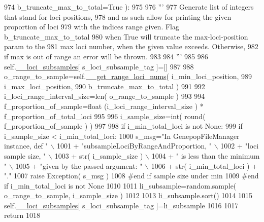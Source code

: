 \begin{DoxyCode}
974             b\_truncate\_max\_to\_total=\textcolor{keyword}{True} ):
975             
976         \textcolor{stringliteral}{'''}
977 \textcolor{stringliteral}{        Generate list of integers that stand for loci positions,}
978 \textcolor{stringliteral}{        and as such allow for printing the given proportion of loci}
979 \textcolor{stringliteral}{        with the indices range given.  Flag b\_truncate\_max\_to\_total}
980 \textcolor{stringliteral}{        when True will truncate the max-loci-position param to the}
981 \textcolor{stringliteral}{        max loci number, when the given value exceeds.  Otherwise,}
982 \textcolor{stringliteral}{        if max is out of range an error will be thrown.}
983 \textcolor{stringliteral}{}
984 \textcolor{stringliteral}{        '''}
985 
986         self.\hyperlink{classnegui_1_1genepopfilemanager_1_1GenepopFileManager_af867ba70728e8a3aaf0097ddd6399e28}{\_\_loci\_subsamples}[ s\_loci\_subsample\_tag ]=[]
987 
988         o\_range\_to\_sample=self.\hyperlink{classnegui_1_1genepopfilemanager_1_1GenepopFileManager_aaa92e1946fdacb522325a288e00eac71}{\_\_get\_range\_loci\_nums}( i\_min\_loci\_position, 
989                                                             i\_max\_loci\_position,
990                                                             b\_truncate\_max\_to\_total )
991         
992         i\_loci\_range\_interval\_size=len( o\_range\_to\_sample )
993 
994         f\_proportion\_of\_sample=float (i\_loci\_range\_interval\_size  ) * f\_proportion\_of\_total\_loci 
995 
996         i\_sample\_size=int( round(  f\_proportion\_of\_sample ) )
997         
998         \textcolor{keywordflow}{if} i\_min\_total\_loci \textcolor{keywordflow}{is} \textcolor{keywordflow}{not} \textcolor{keywordtype}{None}:
999             \textcolor{keywordflow}{if} i\_sample\_size < i\_min\_total\_loci:
1000                 s\_msg=\textcolor{stringliteral}{"In GenepopFileManager instance, def "} \(\backslash\)
1001                             + \textcolor{stringliteral}{"subsampleLociByRangeAndProportion, "} \(\backslash\)
1002                             + \textcolor{stringliteral}{"loci sample size, "} \(\backslash\)
1003                             + str( i\_sample\_size )  \(\backslash\)
1004                             + \textcolor{stringliteral}{" is less than the minimum "} \(\backslash\)
1005                             + \textcolor{stringliteral}{"given by the passed argument: "}  \(\backslash\)
1006                             + str( i\_min\_total\_loci ) + \textcolor{stringliteral}{"."}
1007                 \textcolor{keywordflow}{raise} Exception( s\_msg )
1008             \textcolor{comment}{#end if sample size under min}
1009         \textcolor{comment}{#end if i\_min\_total\_loci is not None}
1010 
1011         li\_subsample=random.sample( o\_range\_to\_sample, i\_sample\_size )
1012 
1013         li\_subsample.sort()
1014 
1015         self.\hyperlink{classnegui_1_1genepopfilemanager_1_1GenepopFileManager_af867ba70728e8a3aaf0097ddd6399e28}{\_\_loci\_subsamples}[ s\_loci\_subsample\_tag ]=li\_subsample
1016 
1017         \textcolor{keywordflow}{return}
1018 
\end{DoxyCode}
